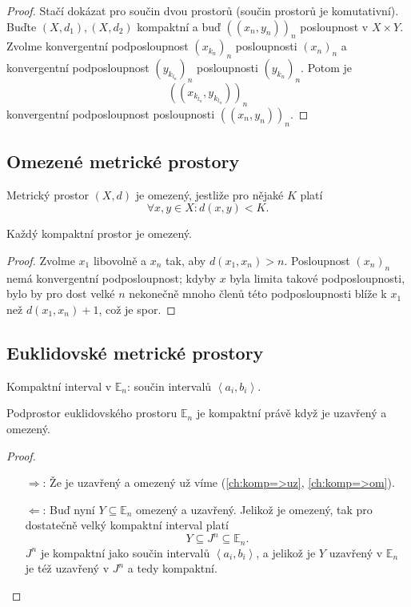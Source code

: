 \documentclass[../main.tex]{subfiles}
\begin{document}
\begin{proof}
	Stačí dokázat pro součin dvou prostorů (součin prostorů je komutativní).
	Buďte $(X,d_1), (X, d_2)$ kompaktní a buď $((x_n,y_n))_n$ posloupnost v $X \times Y$. 
	Zvolme konvergentní podposloupnost $(x_{k_n})_n$ posloupnosti $(x_n)_n$ a konvergentní podposloupnost $(y_{k_{l_n}})_n$ posloupnosti $(y_{k_n})_n$.
	Potom je 
	\[((x_{k_{l_n}},y_{k_{l_n}}))_n\]
	konvergentní podposloupnost posloupnosti $((x_n,y_n))_n$.
\end{proof}

\subsection{Omezené metrické prostory}

\begin{definition}
	Metrický prostor $(X,d)$ je omezený, jestliže pro nějaké $K$ platí
	\[\forall x,y \in X : d(x,y) < K.\]
\end{definition}

\begin{lemma}\label{ch:komp=>om}
	Každý kompaktní prostor je omezený.
\end{lemma}

\begin{proof}
	Zvolme $x_1$ libovolně a $x_n$ tak, aby $d(x_1,x_n) > n$. Posloupnost $(x_n)_n$ nemá konvergentní podposloupnost; kdyby $x$
	byla limita takové podposloupnosti, bylo by pro dost velké $n$ nekonečně mnoho členů této podposloupnosti blíže k $x_1$ než $d(x_1,x_n)+1$, což je spor.
\end{proof}

\subsection{Euklidovské metrické prostory}
\begin{remark}
	Kompaktní interval v $\mathbb{E}_n$: součin intervalů $\left<a_i,b_i\right>$.
\end{remark}

\begin{theorem}
	Podprostor euklidovského prostoru $\mathbb{E}_n$ je kompaktní právě když je uzavřený a omezený.
\end{theorem}

\begin{proof}
	\begin{enumerate}
		\item[$\Rightarrow$:] Že je uzavřený a omezený už víme (\ref{ch:komp=>uz}, \ref{ch:komp=>om}).
		\item[$\Leftarrow$:] Buď nyní $Y \subseteq \mathbb{E}_n$ omezený a uzavřený. Jelikož je omezený, tak pro dostatečně velký kompaktní interval platí
	    \[Y \subseteq J^n \subseteq \mathbb{E}_n.\]
	    $J^n$ je kompaktní jako součin intervalů $\left<a_i,b_i\right>$, a jelikož je $Y$ uzavřený v $\mathbb{E}_n$ je též uzavřený
	    v $J^n$ a tedy kompaktní.
	\end{enumerate}
\end{proof}
\end{document}
